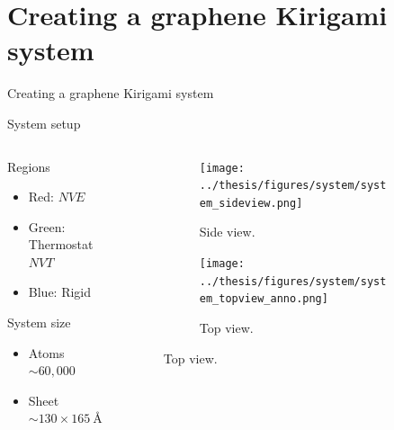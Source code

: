 \documentclass[
	10pt, %
]{beamer}
\begin{document}
\section{Creating a graphene Kirigami system} %
\begin{frame}{Creating a graphene Kirigami system}
    \tableofcontents[currentsection]
\end{frame}


%
%
\begin{frame}{System setup}
	\begin{columns} 
		\hspace{5mm}
		\begin{column}{.4\textwidth}
			Regions
			\begin{itemize}
				\item Red: $NVE$
				\item Green: Thermostat $NVT$
				\item Blue: Rigid 
			\end{itemize}
			\vspace*{5mm}
			System size
			\begin{itemize}
				\item Atoms $\sim 60,000$
				\item Sheet $\sim 130 \times \SI{165}{\text{Å}}$
			\end{itemize}
		\end{column}
		\begin{column}{.5\textwidth}
			\begin{figure}[H]
				\raggedright
				\begin{subfigure}[b]{0.9\textwidth}
					\centering
					\texttt{[image: ../thesis/figures/system/system\_sideview.png]}
					\caption{Side view.}
				\end{subfigure}
				\begin{subfigure}[b]{0.9\textwidth}
					\centering
					\texttt{[image: ../thesis/figures/system/system\_topview\_anno.png]}
					\caption{Top view.}
				\end{subfigure}
			\end{figure}
		\end{column}%
	\end{columns}


	
\end{frame}
\end{document}
